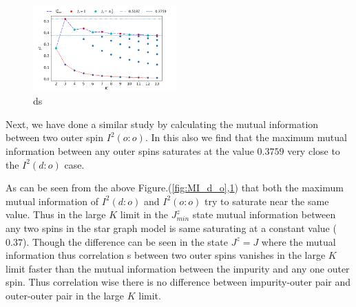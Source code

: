 \documentclass[reprint,prb,superscriptaddress]{revtex4-2}
\begin{document}
\begin{figure}[!htpb]
\includegraphics[width=0.49\textwidth]{plt/NEW31Dec_I_2_vs_Nch_[1,2]}
\caption{ds}
\label{fig:MI_o_o}
\end{figure}
Next, we have done a similar study by calculating the mutual information between two outer spin $I^2(o:o)$. In this also we find that the maximum mutual information between any outer spins saturates at the value $0.3759$ very close to the $I^2(d:o)$ case.

\par As can be seen from the above Figure.(\ref{fig:MI_d_o},\ref{fig:MI_o_o}) that  both the maximum mutual information of $I^2(d:o)$ and $I^2(o:o)$ try to saturate near the same value. Thus in the large $K$ limit in the $J^z_{min}$ state mutual information between any two spins in the star graph model is same saturating at a constant value ($0.37$). Though the difference can be seen in the state $J^z=J$ where the mutual information thus correlation s between two outer spins vanishes in the large $K$ limit faster than the mutual information between the impurity and any one outer spin. Thus correlation wise there is no difference between impurity-outer pair and outer-outer pair in the large $K$ limit.
\end{document}
